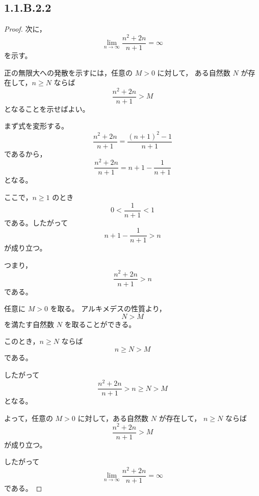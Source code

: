 \subsection{1.1.B.2.2}
\begin{proof}
    次に，
    \[
        \lim_{n\to\infty}
        \frac{n^2+2n}{n+1}
        =
        \infty
    \]
    を示す。

    正の無限大への発散を示すには，任意の $M>0$ に対して，
    ある自然数 $N$ が存在して，$n\geq N$ ならば
    \[
        \frac{n^2+2n}{n+1}>M
    \]
    となることを示せばよい。

    まず式を変形する。
    \[
        \frac{n^2+2n}{n+1}
        =
        \frac{(n+1)^2-1}{n+1}
    \]
    であるから，
    \[
        \frac{n^2+2n}{n+1}
        =
        n+1-\frac{1}{n+1}
    \]
    となる。

    ここで，$n\geq 1$ のとき
    \[
        0<\frac{1}{n+1}<1
    \]
    である。したがって
    \[
        n+1-\frac{1}{n+1}>n
    \]
    が成り立つ。

    つまり，
    \[
        \frac{n^2+2n}{n+1}>n
    \]
    である。

    任意に $M>0$ を取る。
    アルキメデスの性質より，
    \[
        N>M
    \]
    を満たす自然数 $N$ を取ることができる。

    このとき，$n\geq N$ ならば
    \[
        n\geq N>M
    \]
    である。

    したがって
    \[
        \frac{n^2+2n}{n+1}>n\geq N>M
    \]
    となる。

    よって，任意の $M>0$ に対して，ある自然数 $N$ が存在して，
    $n\geq N$ ならば
    \[
        \frac{n^2+2n}{n+1}>M
    \]
    が成り立つ。

    したがって
    \[
        \lim_{n\to\infty}
        \frac{n^2+2n}{n+1}
        =
        \infty
    \]
    である。
\end{proof}